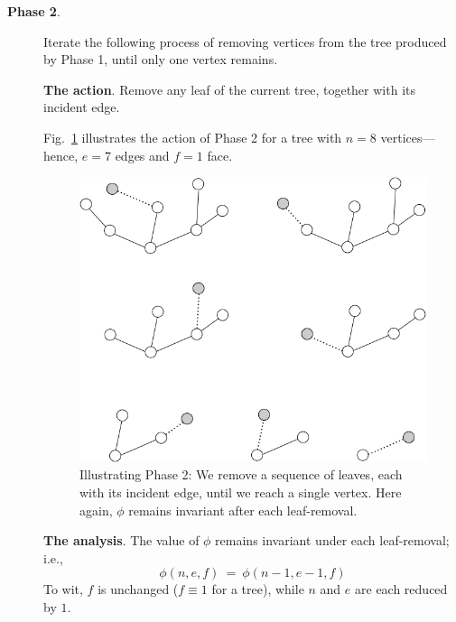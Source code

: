 \begin{description}
\smallskip

\item[{\bf Phase 2}.]
Iterate the following process of removing vertices from the tree produced
by Phase 1, until only one vertex remains.

\bigskip

{\bf The action}.
Remove any leaf of the current tree, together with its incident edge.

Fig.~\ref{fig:planarStep2} illustrates the action of Phase  2
for a tree  with $n=8$ vertices---hence, $e=7$ edges and $f=1$ face.
\begin{figure}[hbt]
\begin{center}
   \includegraphics[scale=0.35]{FiguresGraph/planarStep2}
   \caption{Illustrating Phase 2: We remove a sequence of leaves, each
     with its incident edge, until we reach a single vertex.  Here again,
     $\phi$ remains invariant after each leaf-removal.}
  \label{fig:planarStep2}
\end{center}
\end{figure}

\bigskip

{\bf The analysis}.
The value of $\phi$ remains invariant under each leaf-removal; i.e.,
\[ \phi(n,e,f) \ = \ \phi(n-1,e-1,f) \]
To wit, $f$ is unchanged ($f \equiv 1$ for a tree), while $n$ and $e$ are
each reduced by $1$.
\end{description}


\newpage


